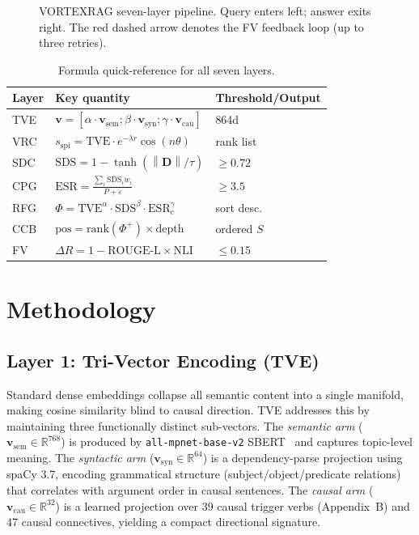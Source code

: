 \documentclass[10pt,twocolumn]{article}
\newcommand{\secvspace}{\vspace{-4pt}}
\newcommand{\R}{\mathbb{R}}
\newcommand{\norm}[1]{\left\|#1\right\|}
\newcommand{\tvec}{\mathbf{v}}
\begin{document}
\begin{figure}[t]
\begin{tikzpicture}
\end{tikzpicture}
\caption{VORTEXRAG seven-layer pipeline.  Query enters left; answer exits right.
The red dashed arrow denotes the FV feedback loop (up to three retries).}
\label{fig:pipeline}
\end{figure}

\begin{table}[h]
\centering
\caption{Formula quick-reference for all seven layers.}
\label{tab:quickref}
\setlength{\tabcolsep}{3pt}
\small
\begin{tabular}{@{}lll@{}}
\toprule
\textbf{Layer} & \textbf{Key quantity} & \textbf{Threshold/Output} \\
\midrule
TVE & $\tvec\!=\![\alpha\cdot\mathbf{v}_\text{sem};\beta\cdot\mathbf{v}_\text{syn};\gamma\cdot\mathbf{v}_\text{cau}]$ & 864d\\
VRC & $s_\text{spi}\!=\!\text{TVE}\cdot e^{-\lambda r}\cos(n\theta)$ & rank list\\
SDC & $\text{SDS}\!=\!1\!-\!\tanh(\norm{\mathbf{D}}/\tau)$ & $\geq 0.72$\\
CPG & $\text{ESR}\!=\!\frac{\sum_i \text{SDS}_i w_i}{P+\varepsilon}$ & $\geq 3.5$\\
RFG & $\Phi\!=\!\text{TVE}^\alpha\!\cdot\!\text{SDS}^\beta\!\cdot\!\text{ESR}_c^\gamma$ & sort desc.\\
CCB & $\text{pos}\!=\!\text{rank}(\Phi^+)\!\times\!\text{depth}$ & ordered $S$\\
FV  & $\Delta R\!=\!1\!-\!\text{ROUGE-L}\!\times\!\text{NLI}$ & $\leq 0.15$\\
\bottomrule
\end{tabular}
\end{table}

\section{Methodology}\label{sec:method}
\secvspace

\subsection{Layer 1: Tri-Vector Encoding (TVE)}\label{ssec:tve}

Standard dense embeddings collapse all semantic content into a single
manifold, making cosine similarity blind to causal direction.  TVE addresses
this by maintaining three functionally distinct sub-vectors.  The
\emph{semantic arm} ($\mathbf{v}_\text{sem} \in \R^{768}$) is produced by
\texttt{all-mpnet-base-v2} SBERT~\citep{reimers2019sentence} and captures
topic-level meaning.  The \emph{syntactic arm} ($\mathbf{v}_\text{syn} \in \R^{64}$)
is a dependency-parse projection using spaCy 3.7, encoding grammatical structure
(subject/object/predicate relations) that correlates with argument order in
causal sentences.  The \emph{causal arm} ($\mathbf{v}_\text{cau} \in \R^{32}$)
is a learned projection over 39 causal trigger verbs (Appendix~B) and 47
causal connectives, yielding a compact directional signature.
\end{document}
